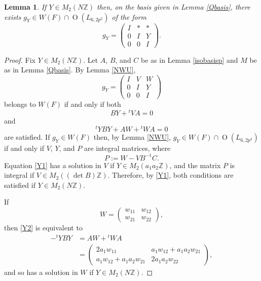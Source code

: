 \documentclass[11pt]{amsart}
\newtheorem{lem}[thm]{Lemma}
\newcommand{\ZZ}{\mathbb{Z}}
\newcommand{\opn}{\operatorname}
\begin{document}
\begin{lem}\label{Ylemma}
If $Y \in M_2(N \ZZ)$ then, on the basis given in Lemma \ref{Qbasis}, there exists $g_Y \in W(F) \cap \opn{O}(L_{6,2p^2})$ of the form
\begin{equation*}
g_Y = 
\begin{pmatrix}
I & * & * \\ 
0 & I & Y \\ 
0 & 0 & I
\end{pmatrix}.
\end{equation*}
\end{lem}
\begin{proof}
Fix $Y \in M_2(N \ZZ)$.
Let $A$, $B$, and $C$ be as in Lemma \ref{isobasisp} and $M$ be as in Lemma \ref{Qbasis}.
By Lemma \ref{NWU},
\begin{equation*}
g_Y
=
\begin{pmatrix}
I & V & W \\
0 & I & Y \\
0 & 0 & I 
\end{pmatrix}
\end{equation*}
belongs to $W(F)$ if and only if both
\begin{equation}\label{Y1}
BY + {}^t VA = 0
\end{equation}
and
\begin{equation}\label{Y2}
{}^t YBY + AW + {}^t WA = 0
\end{equation}
are satisfied.
If $g_Y \in W(F)$ then, by Lemma \ref{NWU}, $g_Y \in W(F) \cap \opn{O}(L_{6,2p^2})$ if and only if  
$V$, $Y$, and $P$ are integral matrices, where
\begin{equation*}
P:= W - VB^{-1}C.
\end{equation*}
Equation \eqref{Y1} has a solution in $V$ if $Y \in M_2(a_1 a_2 \ZZ)$, and the matrix $P$ is integral if $V \in M_2( (\opn{det} B) \ZZ)$.
Therefore, by \eqref{Y1}, both conditions are satisfied if $Y \in M_2(N \ZZ)$. 

If 
\begin{equation*}
W = 
\begin{pmatrix}
w_{11} & w_{12} \\
w_{21} & w_{22}
\end{pmatrix},
\end{equation*}
then \eqref{Y2} is equivalent to
\begin{align*}
- {}^tYBY 
& = AW + {}^tWA \\
& = 
\begin{pmatrix}
2a_1 w_{11} & a_1 w_{12} + a_1 a_2 w_{21} \\
a_1 w_{12} + a_1 a_2 w_{21}  &  2a_1 a_2 w_{22}
\end{pmatrix}, 
\end{align*}
and so has a solution in $W$ if $Y \in M_2(N \ZZ)$.  
\end{proof}
\end{document}
